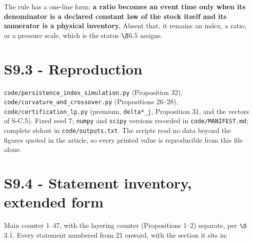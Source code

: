 \documentclass[11pt]{article}
\begin{document}
The rule has a one-line form: \textbf{a ratio becomes an event time only when its denominator is a declared constant law of the stock itself and its numerator is a physical inventory.} Absent that, it remains an index, a ratio, or a pressure scale, which is the status \(\S\)6.5 assigns.

\vspace{0.8em}

\section*{S9.3 - Reproduction}\label{s93---reproduction}

\texttt{code/\allowbreak{}persistence\_\allowbreak{}index\_simula\allowbreak{}tion.\allowbreak{}py} (Proposition 32), \texttt{code/\allowbreak{}curvature\_an\allowbreak{}d\_crossover.\allowbreak{}py} (Propositions 26--28), \texttt{code/\allowbreak{}certificatio\allowbreak{}n\_lp.\allowbreak{}py} (premium, \texttt{delta*\_j}, Proposition 31, and the vectors of S-C.5). Fixed seed 7; \texttt{numpy} and \texttt{scipy} versions recorded in \texttt{code/\allowbreak{}MANIFEST.\allowbreak{}md}; complete stdout in \texttt{code/\allowbreak{}outputs.\allowbreak{}txt}. The scripts read no data beyond the figures quoted in the article, so every printed value is reproducible from this file alone.

\section*{S9.4 - Statement inventory, extended form}\label{s94---statement-inventory-extended-form}

Main counter 1--47, with the layering counter (Propositions 1--2) separate, per \(\S\)3.1. Every statement numbered from 21 onward, with the section it sits in:
\end{document}

